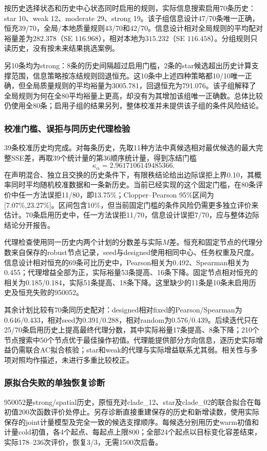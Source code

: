 \documentclass[UTF8,fontset=fandol,11pt,a4paper]{ctexart}
\begin{document}
按历史选择状态和历史中心状态同时启用的规则，实际信息搜索启用70条历史：star 10、weak 12、moderate 29、strong 19。该子组信息设计47/70条唯一正确，恒充39/70，全局/本地质量规则43/70和42/70。信息设计相对全局规则的平均配对裕量差为$282.378$（SE $116.968$），相对本地为$315.232$（SE $116.458$）。分组规则只读历史，没有按未来结果挑选案例。

另10条均为strong：8条的历史间隔超过启用门槛，2条的star候选超出历史计算支撑范围，信息策略按冻结规则回退恒充。这10条中上述四种策略都10/10唯一正确，但全局质量规则的平均裕量为3005.781，回退恒充为791.076。该子组解释了全局规则为何在全80平均裕量上更高，却没有为其增加该组唯一正确数。总体比较仍使用全80条；启用子组的结果另列，整体校准并未提供该子组的条件风险结论。

\subsubsection{校准门槛、误拒与同历史代理检验}
39条校准历史均完成。对每条历史，先取11种方法中真候选相对最优候选的最大完整SSE差，再取39个统计量的第36顺序统计量，得到冻结门槛
\[
 \kappa_\alpha=2.9617106149485366.
\]
在声明混合、独立且交换的历史条件下，有限秩结论给出边际误拒上界0.10，其概率同时平均随机校准数据和一条新历史。当前已经实现的这个固定门槛，在80条评价中任一方法误拒11/80，即13.75\%；Clopper--Pearson 95\%区间为[7.07\%,23.27\%]。区间包含10\%，但当前固定门槛的条件风险仍需更多独立评价来估计。70条启用历史中，任一方法误拒11/70，信息设计误拒7/70，应与整体边际结论分开报告。

代理检查使用同一历史内两个计划的分数差与实际$M$差。恒充和固定节点的代理分数来自保存的robust节点记录，seed与designed使用相同中心、任务权重及尺度。信息设计相对恒充的69条可比历史中，Pearson相关为0.492、Spearman相关为0.455；代理增益全部为正，实际裕量53条提高、16条下降。固定节点相对恒充的相关为0.185/0.184，实际51条提高、18条下降。这里缺少的11条是10条未启用历史及恒充失败的950052。

其余计划比较有70条同历史配对：designed相对fixed的Pearson/Spearman为0.646/0.433，相对seed为0.391/0.288，相对random为0.576/0.439。后续迭代只在25/70条启用历史上提高最终代理分数，其中实际裕量17条提高、8条下降；210个节点搜索中50个节点优于最佳操作初值。代理能提供部分方向信息，逐历史实际增益仍需联合AC拟合核验；star和weak的代理与实际增益联系尤其弱。相关性与多项对照均作描述，未进行多重比较校正。

\subsubsection{原拟合失败的单独恢复诊断}
950052是strong/spatial历史，原恒充对clade\_12、star及clade\_02的联合拟合在每初值200次函数评价处停止。另存诊断直接重建保存的历史和新增读数，使用实际保存的joint计量模型及完全一致的候选支撑顺序。每候选分别用历史warm初值和计量cold初值，各4个起点、每起点上限800；全部24个起点以目标变化容差结束，实际178--236次评价，恢复3/3，无需1500次后备。
\end{document}
